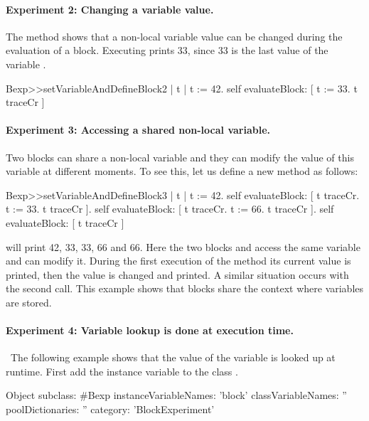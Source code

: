 \documentclass[a4paper,10pt,twoside]{book}
\begin{document}
\paragraph{Experiment 2: Changing a variable value.} The method  shows that a non-local variable value can be changed during the evaluation of a block. Executing  prints 33, since 33 is the last value of the variable .


\begin{code}{}
Bexp>>setVariableAndDefineBlock2
	| t |
	t := 42.
	self evaluateBlock: [ t := 33. t traceCr ]
\end{code}

\paragraph{Experiment 3: Accessing a shared non-local variable.}
Two blocks can share a non-local variable and they can modify the value of this variable at different moments. To see this, let us define a new method  as follows:

\begin{code}{}
Bexp>>setVariableAndDefineBlock3
	| t |
	t := 42.
	self evaluateBlock: [ t traceCr. t := 33. t traceCr ].
	self evaluateBlock: [ t traceCr. t := 66. t traceCr ].
	self evaluateBlock: [ t traceCr ]
\end{code}

 will print 42, 33, 33, 66 and 66.
Here the two blocks \ct{[ t := 33. t traceCr ]} and \ct{[ t := 66. t traceCr ]} access the same variable  and can modify it. During the first execution of the method  its current value  is printed, then the value is changed and printed. A similar situation occurs with the second call. This example shows that blocks share the context where variables are stored.

\paragraph{Experiment 4: Variable lookup is done at execution time.}\
The following example shows that the value of the variable is looked up at runtime.
First add the instance variable \ct{block} to the class \ct{Bexp}.

\begin{code}{}
Object subclass: #Bexp
	instanceVariableNames: 'block'
	classVariableNames: ''
	poolDictionaries: ''
	category: 'BlockExperiment'
\end{code}
\end{document}
